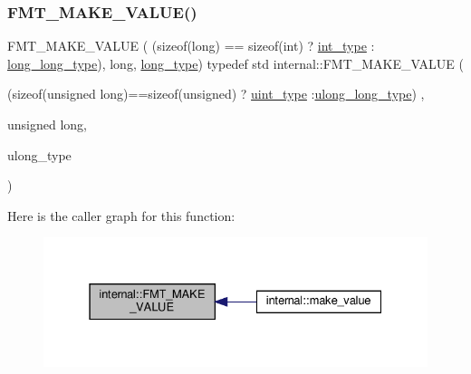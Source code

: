 \subsubsection{\texorpdfstring{F\+M\+T\+\_\+\+M\+A\+K\+E\+\_\+\+V\+A\+L\+U\+E()}{FMT\_MAKE\_VALUE()}\hspace{0.1cm}{\footnotesize\ttfamily [1/3]}}
{\footnotesize\ttfamily F\+M\+T\+\_\+\+M\+A\+K\+E\+\_\+\+V\+A\+L\+UE ( (sizeof(long) == sizeof(int) ? \hyperlink{namespaceinternal_a8661864098ac0acff9a6dd7e66f59038a8be38ea7253d1a414964476f31d00064}{int\+\_\+type} \+: \hyperlink{namespaceinternal_a8661864098ac0acff9a6dd7e66f59038af498903f5d22c64c0160c962cbf210e1}{long\+\_\+long\+\_\+type}), long, \hyperlink{namespaceinternal_a0e92ff50bf0626d16bd3c814946ecd3d}{long\+\_\+type}) typedef std internal\+::\+F\+M\+T\+\_\+\+M\+A\+K\+E\+\_\+\+V\+A\+L\+UE (\begin{DoxyParamCaption}\item[{(sizeof(unsigned long)==sizeof(unsigned) ? \hyperlink{namespaceinternal_a8661864098ac0acff9a6dd7e66f59038aa2a554d9072770a945ebf5363650f7a1}{uint\+\_\+type} \+:\hyperlink{namespaceinternal_a8661864098ac0acff9a6dd7e66f59038af31bdba5c2a6e81482fa2a1e8b8195f6}{ulong\+\_\+long\+\_\+type})}]{,  }\item[{unsigned}]{long,  }\item[{ulong\+\_\+type}]{ }\end{DoxyParamCaption})}

Here is the caller graph for this function\+:
\nopagebreak
\begin{figure}[H]
\begin{center}
\leavevmode
\includegraphics[width=331pt]{namespaceinternal_abc2b5d27eb4b4952f43ef2c96fa08146_icgraph}
\end{center}
\end{figure}
\mbox{\label{namespaceinternal_a9a3696389145c4bf6099748c4a2e9380}} 
